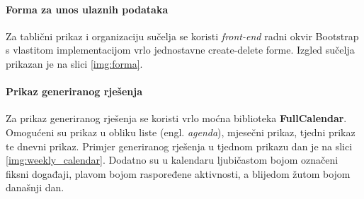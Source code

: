 \documentclass[times, utf8, zavrsni]{fer}
\begin{document}
\paragraph{Forma za unos ulaznih podataka} Za tablični prikaz i organizaciju sučelja se koristi \textit{front-end} radni okvir Bootstrap s vlastitom implementacijom vrlo jednostavne create-delete forme. Izgled sučelja prikazan je na slici \ref{img:forma}.

\paragraph{Prikaz generiranog rješenja} Za prikaz generiranog rješenja se koristi vrlo moćna biblioteka \textbf{FullCalendar}. Omogućeni su prikaz u obliku liste (engl. \textit{agenda}), mjesečni prikaz, tjedni prikaz te dnevni prikaz. Primjer generiranog rješenja u tjednom prikazu dan je na slici \ref{img:weekly_calendar}. Dodatno su u kalendaru ljubičastom bojom označeni fiksni događaji, plavom bojom raspoređene aktivnosti, a blijedom žutom bojom današnji dan.
\end{document}
